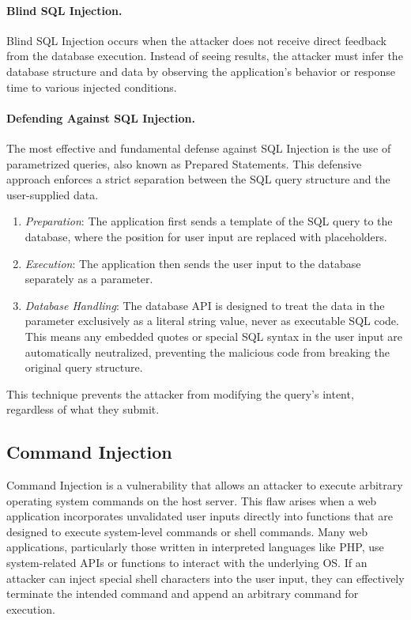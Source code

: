 \paragraph{Blind SQL Injection.} Blind SQL Injection occurs when the attacker does not receive direct feedback from the database execution. Instead of seeing results, the attacker must infer the database structure and data by observing the application's behavior or response time to various injected conditions.

\paragraph{Defending Against SQL Injection.} The most effective and fundamental defense against SQL Injection is the use of parametrized queries, also known as Prepared Statements. This defensive approach enforces a strict separation between the SQL query structure and the user-supplied data.

\begin{enumerate}
    \item \textit{Preparation}: The application first sends a template of the SQL query to the database, where the position for user input are replaced with placeholders.
    \item \textit{Execution}: The application then sends the user input to the database separately as a parameter.
    \item \textit{Database Handling}: The database API is designed to treat the data in the parameter exclusively as a literal string value, never as executable SQL code. This means any embedded quotes or special SQL syntax in the user input are automatically neutralized, preventing the malicious code from breaking the original query structure.
\end{enumerate}

This technique prevents the attacker from modifying the query's intent, regardless of what they submit.

\subsection{Command Injection}
Command Injection is a vulnerability that allows an attacker to execute arbitrary operating system commands on the host server. This flaw arises when a web application incorporates unvalidated user inputs directly into functions that are designed to execute system-level commands or shell commands. Many web applications, particularly those written in interpreted languages like PHP, use system-related APIs or functions to interact with the underlying OS. If an attacker can inject special shell characters into the user input, they can effectively terminate the intended command and append an arbitrary command for execution.

